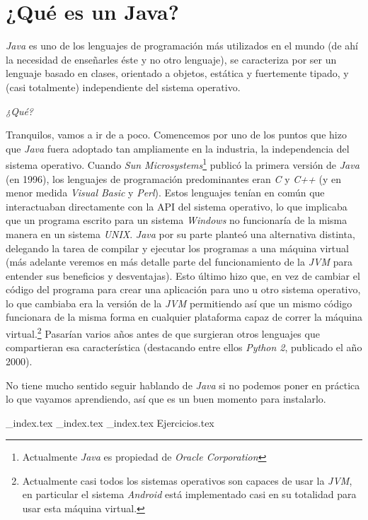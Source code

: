 \chapter{¿Qué es un Java?}
  \label{ch:java}
  \textit{Java} es uno de los lenguajes de programación más utilizados en el mundo (de ahí la 
  necesidad de enseñarles éste y no otro lenguaje), se caracteriza por ser un lenguaje basado en 
  clases, orientado a objetos, estática y fuertemente tipado, y (casi totalmente) independiente del sistema 
  operativo.
  
  \begin{center}
    \textit{¿Qué?}
  \end{center}

  Tranquilos, vamos a ir de a poco.
  Comencemos por uno de los puntos que hizo que \textit{Java} fuera adoptado tan ampliamente en la
  industria, la independencia del sistema operativo.
  Cuando \textit{Sun Microsystems}\footnote{Actualmente \textit{Java} es propiedad de 
  \textit{Oracle Corporation}} publicó la primera versión de \textit{Java} (en 1996), los 
  lenguajes de programación predominantes eran \textit{C} y \textit{C++} (y en menor medida 
  \textit{Visual Basic} y \textit{Perl}).
  Estos lenguajes tenían en común que interactuaban directamente con la API del sistema operativo,
  lo que implicaba que un programa escrito para un sistema \textit{Windows} no funcionaría de la
  misma manera en un sistema \textit{UNIX}.
  \textit{Java} por su parte planteó una alternativa distinta, delegando la tarea de compilar y 
  ejecutar los programas a una máquina virtual (más adelante veremos en más detalle parte del 
  funcionamiento de la \textit{JVM} para entender sus beneficios y desventajas).
  Esto último hizo que, en vez de cambiar el código del programa para crear una aplicación para 
  uno u otro sistema operativo, lo que cambiaba era la versión de la \textit{JVM} permitiendo así
  que un mismo código funcionara de la misma forma en cualquier plataforma capaz de correr la 
  máquina virtual.\footnote{Actualmente casi todos los sistemas operativos son capaces de usar la 
  \textit{JVM}, en particular el sistema \textit{Android} está implementado casi en su totalidad 
  para usar esta máquina virtual.}
  Pasarían varios años antes de que surgieran otros lenguajes que compartieran esa característica
  (destacando entre ellos \textit{Python 2}, publicado el año 2000).

  No tiene mucho sentido seguir hablando de \textit{Java} si no podemos poner en práctica lo que 
  vayamos aprendiendo, así que es un buen momento para instalarlo.
  
  {_index.tex}
  {_index.tex}
  {_index.tex}
  {Ejercicios.tex}

\printbibliography[keyword=Por_algo_se_empieza]